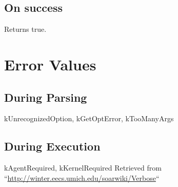 \documentclass[10pt]{article}
\begin{document}
\subsection*{ On success }


 Returns true. 
\section*{ Error Values }
\subsection*{ During Parsing }


 kUnrecognizedOption, kGetOptError, kTooManyArgs
\subsection*{ During Execution }


 kAgentRequired, kKernelRequired Retrieved from ``\url{http://winter.eecs.umich.edu/soarwiki/Verbose}``
\end{document}
